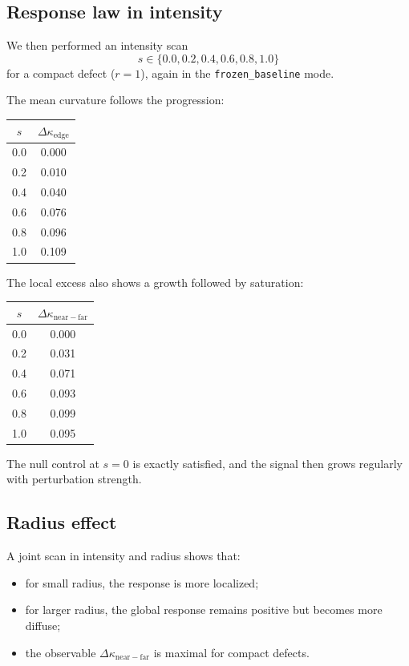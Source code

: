 \documentclass[11pt]{article}
\begin{document}
\subsection{Response law in intensity}

We then performed an intensity scan
\[
s \in \{0.0,0.2,0.4,0.6,0.8,1.0\}
\]
for a compact defect ($r=1$), again in the \texttt{frozen\_baseline} mode.

The mean curvature follows the progression:

\begin{center}
\begin{tabular}{cc}
\toprule
$s$ & $\Delta \kappa_{\mathrm{edge}}$ \\
\midrule
0.0 & 0.000 \\
0.2 & 0.010 \\
0.4 & 0.040 \\
0.6 & 0.076 \\
0.8 & 0.096 \\
1.0 & 0.109 \\
\bottomrule
\end{tabular}
\end{center}

The local excess also shows a growth followed by saturation:

\begin{center}
\begin{tabular}{cc}
\toprule
$s$ & $\Delta \kappa_{\mathrm{near-far}}$ \\
\midrule
0.0 & 0.000 \\
0.2 & 0.031 \\
0.4 & 0.071 \\
0.6 & 0.093 \\
0.8 & 0.099 \\
1.0 & 0.095 \\
\bottomrule
\end{tabular}
\end{center}

The null control at $s=0$ is exactly satisfied, and the signal then grows regularly with perturbation strength.

\subsection{Radius effect}

A joint scan in intensity and radius shows that:

\begin{itemize}
\item for small radius, the response is more localized;
\item for larger radius, the global response remains positive but becomes more diffuse;
\item the observable $\Delta \kappa_{\mathrm{near-far}}$ is maximal for compact defects.
\end{itemize}
\end{document}
